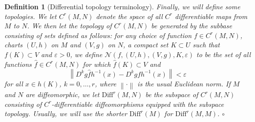 \documentclass[11pt, a4paper]{memoir}
\theoremstyle{break}
\theoremstyle{break}
\newtheorem{innerdefn}{Definition}
\newenvironment{defn}
  {\begin{innerdefn}}
  {\ensuremath{\circ}\end{innerdefn}}
\theoremstyle{nonumberplain}
\newcommand{\norm}[1]{\left\lVert#1\right\rVert}
\begin{document}
\begin{defn}[Differential topology terminology]
Finally, we will define some topologies. We let $C^r(M,N)$ denote the space of all $C^r$ differentiable maps from $M$ to $N$. We then let the topology of $C^r(M,N)$ be generated by the subbase consisting of sets defined as follows: for any choice of function $f\in C^r(M,N)$, charts $(U,h)$ on $M$ and $(V,g)$ on $N$, a compact set $K\subset U$ such that $f(K)\subset V$ and $\varepsilon>0$, we define $\mathcal{N}(f,(U,h),(V,g),K,\varepsilon)$ to be the set of all functions $\hat{f}\in C^r(M,N)$ for which $\hat{f}(K)\subset V$ and
$$\norm{D^kg\hat{f}h^{-1}(x)-D^kgfh^{-1}(x)}<\varepsilon$$
for all $x\in h(K)$, $k=0,\ldots,r$, where $\norm{\cdot}$ is the usual Euclidean norm. If $M$ and $N$ are diffeomorphic, we let $\text{Diff}^r(M,N)$ be the subspace of $C^r(M,N)$ consisting of $C^r$-differentiable diffeomorphisms equipped with the subspace topology. Usually, we will use the shorter $\text{Diff}^r(M)$ for $\text{Diff}^r(M,M)$.
\end{defn}
\end{document}
